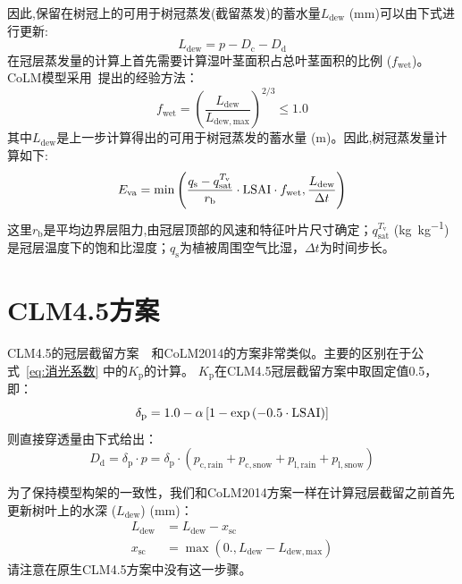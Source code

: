 因此,保留在树冠上的可用于树冠蒸发(截留蒸发)的蓄水量$L_{\mathrm{dew}}$ (mm)可以由下式进行更新:
\begin{equation}
  L_{\mathrm{dew}}={p}-D_{\mathrm{c}}-D_{\mathrm{d}}
\end{equation}
在冠层蒸发量的计算上首先需要计算湿叶茎面积占总叶茎面积的比例 ($f_{\mathrm{wet}}$)。CoLM模型采用~\citet{dickinson1993biosphere}提出的经验方法：
\begin{equation}
  f_{\mathrm{wet}}=\left(\frac{L_{\mathrm{dew}}}{L_{\mathrm{dew,max}}}\right)^{2 / 3} \leqslant 1.0
\end{equation}
其中$L_{\mathrm{dew}}$是上一步计算得出的可用于树冠蒸发的蓄水量 (m)。因此,树冠蒸发量计算如下:
\begin{equation}
  E_{\mathrm{va}} =\min \left(\frac{q_{\mathrm{s}}-q_{\mathrm{sat}}^{T_{\mathrm{v}}}}{r_{\mathrm{b}}}\cdot{\rm LSAI}\cdot f_{\mathrm{wet}}, \frac{L_{\mathrm{dew}}}{\Delta t}\right)
\end{equation}
这里$r_{\mathrm {b}} $是平均边界层阻力,由冠层顶部的风速和特征叶片尺寸确定；$q_{\mathrm{sat}}^{T_{\mathrm {v}} }$ (\unit{kg.kg^{-1}})是冠层温度下的饱和比湿度；$q_{\mathrm {s}} $为植被周围空气比湿，$\Delta t$为时间步长。


\section{CLM4.5方案}
CLM4.5的冠层截留方案~\citep{oleson2013technical}~和CoLM2014的方案非常类似。主要的区别在于公式~\eqref{eq:消光系数} 中的$K_{\mathrm {p}} $的计算。
$K_{\mathrm {p}} $在CLM4.5冠层截留方案中取固定值0.5，即：
%
\begin{equation}
  \delta_{\mathrm{p}}=1.0-\alpha \left[1-\exp \left(-0.5  \cdot{\rm LSAI}\right)\right]
\end{equation}
则直接穿透量由下式给出：
\begin{equation}
  D_{\mathrm{d}}=\delta_{\mathrm{p}} \cdot p=\delta_{\mathrm{p}} \cdot\left(p_{\mathrm{c,rain}}+p_{\mathrm{c,snow}}+p_{\mathrm{l,rain}}+p_{\mathrm{l,snow}}\right)
\end{equation}

为了保持模型构架的一致性，我们和CoLM2014方案一样在计算冠层截留之前首先更新树叶上的水深 ($L_{\mathrm{dew}}$) (mm)：
\begin{equation}
  \begin{aligned}
    L_{\mathrm{dew}} &= L_{\mathrm{dew}}-x_{\mathrm{sc}} \\
    x_{\mathrm{s c}} &= \max \left(0., L_{\mathrm{dew}}-L_{\mathrm{dew,max}}\right)
  \end{aligned}
\end{equation}
请注意在原生CLM4.5方案中没有这一步骤。

